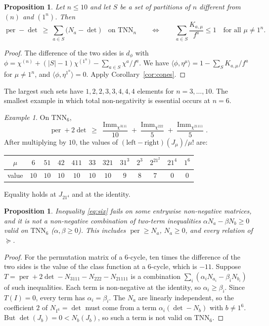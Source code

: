 \documentclass[11pt]{amsart}
\newtheorem{proposition}[theorem]{Proposition}
\theoremstyle{definition}
\theoremstyle{remark}
\newtheorem{exa}{Example}[section]
\newcommand{\Imm}{\operatorname{Imm}}
\newcommand{\TNN}{\mathrm{TNN}}
\newcommand{\per}{\operatorname{per}}
\begin{document}
\begin{proposition}\label{prop:excess}
Let $n\le10$ and let $S$ be a set of partitions of $n$ different from $(n)$ and $(1^n)$. Then
\[
\per-\det\ \ge\ \sum_{a\in S}\bigl(N_a-\det\bigr)\quad\text{on }\TNN_n
\qquad\iff\qquad
\sum_{a\in S}\frac{K_{a,\mu}}{f^a}\le1\quad\text{for all }\mu\ne1^n .
\]
\end{proposition}

\begin{proof}
The difference of the two sides is $d_\phi$ with $\phi=\chi^{(n)}+(|S|-1)\chi^{(1^n)}-\sum_{a\in S}\chi^a/f^a$. We have $\langle\phi,\eta^\mu\rangle=1-\sum_SK_{a,\mu}/f^a$ for $\mu\ne1^n$, and $\langle\phi,\eta^{1^n}\rangle=0$. Apply Corollary~\ref{cor:cones}.
\end{proof}

The largest such sets have $1,2,2,3,3,4,4,4$ elements for $n=3,\dots,10$. The smallest example in which total non-negativity is essential occurs at $n=6$.

\begin{exa}\label{ex:six}
On $\TNN_6$,
\begin{equation}\label{eq:six}
\per+2\det\ \ge\ \frac{\Imm_{\chi^{3111}}}{10}+\frac{\Imm_{\chi^{222}}}{5}+\frac{\Imm_{\chi^{21111}}}{5}.
\end{equation}
After multiplying by $10$, the values of $(\text{left}-\text{right})(J_\mu)/\mu!$ are:
\begin{center}
\small
\begin{tabular}{c*{11}{c}}
\toprule
$\mu$ & $6$ & $51$ & $42$ & $411$ & $33$ & $321$ & $31^3$ & $2^3$ & $2^21^2$ & $21^4$ & $1^6$\\
\midrule
value & $10$ & $10$ & $10$ & $10$ & $10$ & $10$ & $9$ & $8$ & $7$ & $0$ & $0$\\
\bottomrule
\end{tabular}
\end{center}
Equality holds at $J_{21^4}$ and at the identity.
\end{exa}

\begin{proposition}\label{prop:notpairwise}
Inequality \eqref{eq:six} fails on some entrywise non-negative matrices, and it is not a non-negative combination of two-term inequalities $\alpha N_a-\beta N_b\ge0$ valid on $\TNN_6$ ($\alpha,\beta\ge0$). This includes $\per\ge N_a$, $N_a\ge0$, and every relation of $\succeq$.
\end{proposition}

\begin{proof}
For the permutation matrix of a $6$-cycle, ten times the difference of the two sides is the value of the class function at a $6$-cycle, which is $-11$. Suppose $T=\per+2\det-N_{3111}-N_{222}-N_{21111}$ is a combination $\sum_i(\alpha_iN_{a_i}-\beta_iN_{b_i})$ of such inequalities. Each term is non-negative at the identity, so $\alpha_i\ge\beta_i$. Since $T(I)=0$, every term has $\alpha_i=\beta_i$. The $N_a$ are linearly independent, so the coefficient $2$ of $N_{1^6}=\det$ must come from a term $\alpha_i(\det-N_b)$ with $b\ne1^6$. But $\det(J_b)=0<N_b(J_b)$, so such a term is not valid on $\TNN_6$.
\end{proof}
\end{document}
